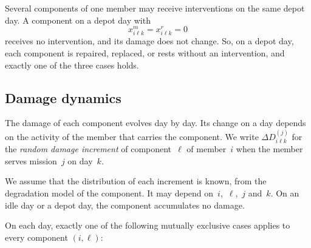 \documentclass[11pt,a4paper]{article}
\theoremstyle{plain}
\theoremstyle{definition}
\theoremstyle{remark}
\begin{document}
Several components of one member may receive interventions on the same depot day.
A component on a depot day with
\begin{equation}
  x^m_{i\ell k} = x^r_{i\ell k} = 0
\end{equation}
receives no intervention, and its damage does not change.
So, on a depot day, each component is repaired, replaced, or rests without an intervention, and exactly one of the three cases holds.


\subsection{Damage dynamics}
\label{sec:damage_dynamics}

The damage of each component evolves day by day.
Its change on a day depends on the activity of the member that carries the component.
We write $\Delta D_{i\ell k}^{(j)}$ for the \emph{random damage increment} of component~$\ell$ of member~$i$ when the member serves mission~$j$ on day~$k$.

We assume that the distribution of each increment is known, from the degradation model of the component.
It may depend on~$i$,~$\ell$,~$j$ and~$k$.
On an idle day or a depot day, the component accumulates no damage.

On each day, exactly one of the following mutually exclusive cases applies to every component $(i,\ell)$:
\end{document}
